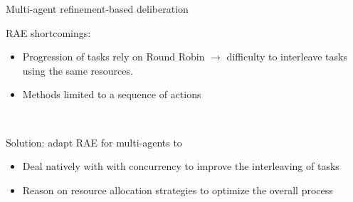\begin{frame}{Multi-agent refinement-based deliberation}

    RAE shortcomings:
    \begin{itemize}
        \item Progression of tasks rely on Round Robin $\rightarrow$ difficulty to interleave tasks using the same resources.
        \item Methods limited to a sequence of actions
    \end{itemize}

    ~~

    Solution: adapt RAE for multi-agents to
    \begin{itemize}
        \item Deal natively with with concurrency to improve the interleaving of tasks
        \item Reason on resource allocation strategies to optimize the overall process
    \end{itemize}

\end{frame}